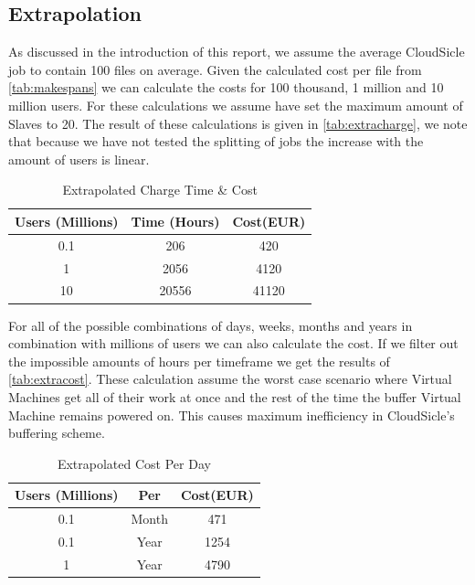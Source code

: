 \documentclass[twocolumn,twoside]{IEEEtran}
\begin{document}
\subsection{Extrapolation}
As discussed in the introduction of this report, we assume the average CloudSicle job to contain 100 files on average.
Given the calculated cost per file from \autoref{tab:makespans} we can calculate the costs for 100 thousand, 1 million and 10 million users.
For these calculations we assume have set the maximum amount of Slaves to 20.
The result of these calculations is given in \autoref{tab:extracharge}, we note that because we have
not tested the splitting of jobs the increase with the amount of users is linear.

\begin{table}[htb]
\caption{Extrapolated Charge Time \& Cost}
\label{tab:extracharge}
\begin{center}

\begin{tabular}{|c||c|c|}
\hline
Users (Millions)&Time (Hours)&Cost(EUR)\\\hline\hline
0.1&206&420\\\hline
1&2056&4120\\\hline
10&20556&41120\\\hline
\end{tabular}

\end{center}
\end{table}

For all of the possible combinations of days, weeks, months and years in combination
with millions of users we can also calculate the cost. If we filter out the impossible
amounts of hours per timeframe we get the results of \autoref{tab:extracost}.
These calculation assume the worst case scenario where Virtual Machines get
all of their work at once and the rest of the time the buffer Virtual Machine
remains powered on. This causes maximum inefficiency in CloudSicle's buffering
scheme.

\begin{table}[htb]
\caption{Extrapolated Cost Per Day}
\label{tab:extracost}
\begin{center}

\begin{tabular}{|c|c||c|}
\hline
Users (Millions)&Per&Cost(EUR)\\\hline\hline
0.1&Month&471\\\hline
0.1&Year&1254\\\hline
1&Year&4790\\\hline
\end{tabular}

\end{center}
\end{table}
\end{document}
